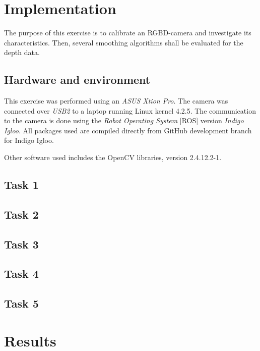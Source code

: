 \documentclass[11pt]{article}
\begin{document}
\section{Implementation}
The purpose of this exercise is to calibrate an RGBD-camera and investigate its characteristics. Then, several smoothing algorithms shall be evaluated for the depth data.
\subsection{Hardware and environment}
This exercise was performed using an \emph{ASUS Xtion Pro}. The camera was connected over \emph{USB2} to a laptop running Linux kernel 4.2.5. The communication to the camera is done using the \emph{Robot Operating System} [ROS] version \emph{Indigo Igloo}. All packages used are compiled directly from GitHub development branch for Indigo Igloo. \par
Other software used includes the OpenCV libraries, version 2.4.12.2-1.
\subsection{Task 1}
\subsection{Task 2}
\subsection{Task 3}
\subsection{Task 4}
\subsection{Task 5}

\section{Results}


\end{document}
